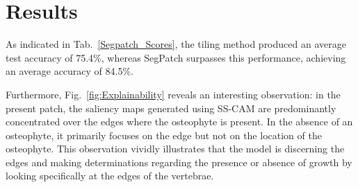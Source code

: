 \documentclass{article}
\newcommand{\update}[1]{\textcolor{black}{#1}}
\begin{document}


\section{Results}

As indicated in Tab.~\ref{Segpatch_Scores}, the tiling method produced an average test accuracy of 75.4\%, whereas SegPatch surpasses this performance, achieving an average accuracy of 84.5\%. 

Furthermore, Fig.~\ref{fig:Explainability} reveals an interesting observation: in the present patch, the saliency maps generated using SS-CAM are predominantly concentrated over the edges where the osteophyte is present. In the absence of an osteophyte, it primarily focuses on the edge but not on the location of the osteophyte. This observation vividly illustrates that the model is discerning the edges and making determinations regarding the presence or absence of growth by looking specifically at the edges of the vertebrae.
\end{document}
